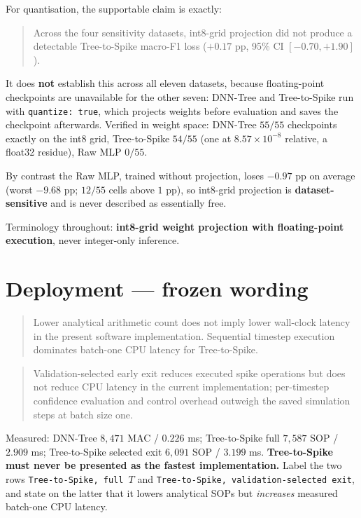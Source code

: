 For quantisation, the supportable claim is exactly:
\begin{quote}
Across the four sensitivity datasets, int8-grid projection did not produce a
detectable Tree-to-Spike macro-F1 loss ($+0.17$ pp, 95\% CI $[-0.70, +1.90]$).
\end{quote}
It does \textbf{not} establish this across all eleven datasets, because floating-point
checkpoints are unavailable for the other seven: DNN-Tree and Tree-to-Spike run with
\texttt{quantize:\,true}, which projects weights before evaluation and saves the
checkpoint afterwards. Verified in weight space: DNN-Tree $55/55$ checkpoints exactly
on the int8 grid, Tree-to-Spike $54/55$ (one at $8.57\times10^{-8}$ relative, a
float32 residue), Raw MLP $0/55$.

By contrast the Raw MLP, trained without projection, loses $-0.97$ pp on average
(worst $-9.68$ pp; $12/55$ cells above $1$ pp), so int8-grid projection is
\textbf{dataset-sensitive} and is never described as essentially free.

Terminology throughout: \textbf{int8-grid weight projection with floating-point
execution}, never integer-only inference.

\section*{Deployment --- frozen wording}

\begin{quote}
Lower analytical arithmetic count does not imply lower wall-clock latency in the
present software implementation. Sequential timestep execution dominates batch-one
CPU latency for Tree-to-Spike.
\end{quote}

\begin{quote}
Validation-selected early exit reduces executed spike operations but does not reduce
CPU latency in the current implementation; per-timestep confidence evaluation and
control overhead outweigh the saved simulation steps at batch size one.
\end{quote}

\noindent Measured: DNN-Tree $8{,}471$ MAC / $0.226$ ms; Tree-to-Spike full
$7{,}587$ SOP / $2.909$ ms; Tree-to-Spike selected exit $6{,}091$ SOP / $3.199$ ms.
\textbf{Tree-to-Spike must never be presented as the fastest implementation.} Label
the two rows \texttt{Tree-to-Spike, full $T$} and \texttt{Tree-to-Spike,
validation-selected exit}, and state on the latter that it lowers analytical SOPs but
\emph{increases} measured batch-one CPU latency.

